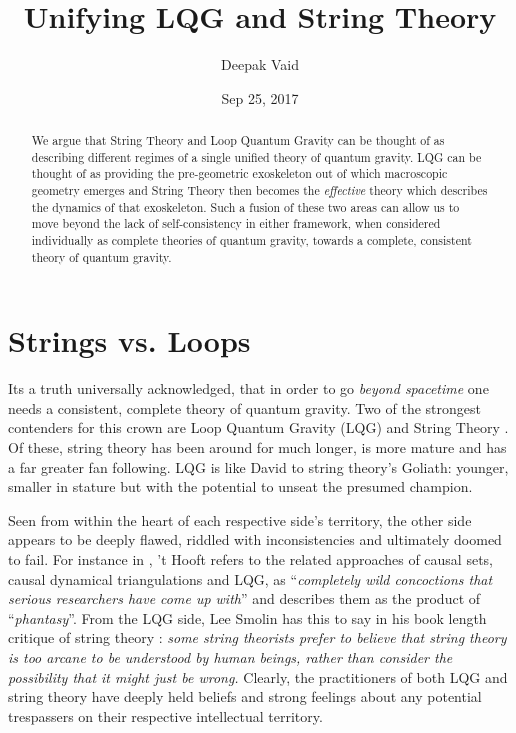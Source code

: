 \documentclass[11pt,a4paper,nofootinbib]{revtex4-1}
\begin{document}
\title{Unifying LQG and String Theory}
\date{Sep 25, 2017}

\author{Deepak Vaid}

\begin{abstract}
	We argue that String Theory and Loop Quantum Gravity can be thought of as describing different regimes of a single unified theory of quantum gravity. LQG can be thought of as providing the pre-geometric exoskeleton out of which macroscopic geometry emerges and String Theory then becomes the \emph{effective} theory which describes the dynamics of that exoskeleton. Such a fusion of these two areas can allow us to move beyond the lack of self-consistency in either framework, when considered individually as complete theories of quantum gravity, towards a complete, consistent theory of quantum gravity.
\end{abstract}

\maketitle

\tableofcontents


\section{Strings vs. Loops}\label{sec:comparison}

Its a truth universally acknowledged, that in order to go \emph{beyond spacetime} one needs a consistent, complete theory of quantum gravity. Two of the strongest contenders for this crown are Loop Quantum Gravity (LQG) \cite{Ashtekar1991Lectures, Rovelli2011Zakopane, Ashtekar2004Background} and String Theory \cite{Tong2010Lectures,Zwiebach2009A-First,Polchinski1998aString}. Of these, string theory has been around for much longer, is more mature and has a far greater fan following. LQG is like David to string theory's Goliath: younger, smaller in stature but with the potential to unseat the presumed champion.

Seen from within the heart of each respective side's territory, the other side appears to be deeply flawed, riddled with inconsistencies and ultimately doomed to fail. For instance in \cite[Sec. 4, pg 6]{t-Hooft2016Natures}, 't Hooft refers to the related approaches of causal sets, causal dynamical triangulations and LQG, as ``\emph{completely wild concoctions that serious researchers have come up with}'' and describes them as the product of ``\emph{phantasy}''. From the LQG side, Lee Smolin has this to say in his book length critique of string theory \cite{Smolin2006The-trouble}: \emph{some string theorists prefer to believe that string theory is too arcane to be understood by human beings, rather than consider the possibility that it might just be wrong.} Clearly, the practitioners of both LQG and string theory have deeply held beliefs and strong feelings about any potential trespassers on their respective intellectual territory.
\end{document}
